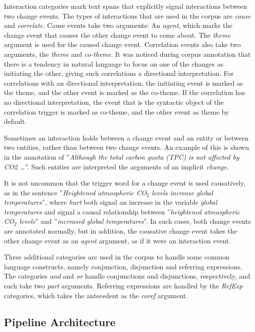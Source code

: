 Interaction categories mark text spans that explicitly signal interactions between two change events. The types of interactions that are used in the corpus are \emph{cause} and \emph{correlate}. Cause events take two arguments: An \emph{agent}, which marks the change event that causes the other change event to come about. The \emph{theme} argument is used for the caused change event. Correlation events also take two arguments, the \emph{theme} and \emph{co-theme}. It was noticed during corpus annotation that there is a tendency in natural language to focus on one of the changes as initiating the other, giving such correlations a directional interpretation. For correlations with an directional interpretation, the initiating event is marked as the theme, and the other event is marked as the co-theme. If the correlation has no directional interpretation, the event that is the syntactic object of the correlation trigger is marked as co-theme, and the other event as theme by default.

Sometimes an interaction holds between a change event and an entity or between two entities, rather than between two change events. An example of this is shown in the annotation of ''\emph{Although the total carbon quota (TPC) is not affected by CO2 \dots}''. Such entities are interpreted the arguments of an implicit \emph{change}. 

It is not uncommon that the trigger word for a change event is used causatively, as in the sentence ''\emph{Heightened atmospheric CO$_2$ levels increase global temperatures}'', where \emph{hurt} both signal an increase in the variable \emph{global temperatures} and signal a causal relationship between ''\emph{heightened atmospheric CO$_2$ levels}'' and ''\emph{increased global temperatures}''. In such cases, both change events are annotated normally, but in addition, the causative change event takes the other change event as an \emph{agent} argument, as if it were an interaction event.

Three additional categories are used in the corpus to handle some common language constructs, namely conjunction, disjunction and referring expressions. The categories \emph{and} and \emph{or} handle conjunctions and disjunctions, respectively, and each take two \emph{part} arguments. Referring expressions are handled by the \emph{RefExp} categories, which takes the antecedent as the \emph{coref} argument.

\subsection{Pipeline Architecture}

